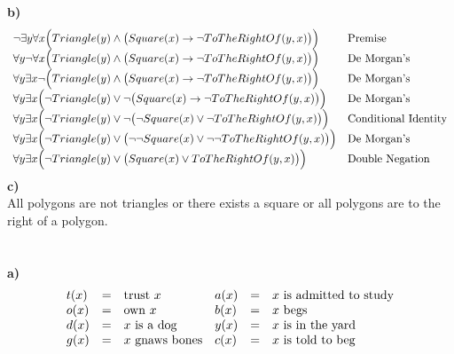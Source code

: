 \documentclass[letterpaper]{article}
\renewcommand\subsection{}
\begin{document}
        \subsection{\bf b)\sf} \\
			\begin{displaymath}
				\begin{array}{ll}
					\neg \exists y \forall x \Big (Triangle(y) \wedge \big (Square(x) \rightarrow \neg ToTheRightOf(y, x)\big)\Big ) 
                    	& $Premise$ \\
                    \forall y \neg \forall x \Big (Triangle(y) \wedge \big (Square(x) \rightarrow \neg ToTheRightOf(y, x)\big)\Big ) 
                    	& $De Morgan's$ \\
                    \forall y \exists x \neg \Big(Triangle(y) \wedge \big (Square(x) \rightarrow \neg ToTheRightOf(y, x)\big)\Big ) 
                    	& $De Morgan's$ \\
                    \forall y \exists x \Big(\neg Triangle(y) \vee \neg \big (Square(x) \rightarrow \neg ToTheRightOf(y, x)\big)\Big ) 
                    	& $De Morgan's$ \\
                    \forall y \exists x \Big(\neg Triangle(y) \vee \neg \big (\neg Square(x) \vee \neg ToTheRightOf(y, x)\big)\Big ) 
                    	& $Conditional Identity$ \\
                    \forall y \exists x \Big(\neg Triangle(y) \vee \big (\neg \neg Square(x) \vee \neg \neg ToTheRightOf(y, x)\big)\Big ) 
                    	& $De Morgan's$ \\
                    \forall y \exists x \Big(\neg Triangle(y) \vee \big (Square(x) \vee ToTheRightOf(y, x)\big)\Big ) 
                    	& $Double Negation$ \\
				\end{array}
			\end{displaymath}
       \subsection{\bf c)\sf} \\
			All polygons are not triangles or there exists a square or all polygons are to the right of a polygon.
	\section{}
    	\subsection{\bf a) \sf}
        	\begin{displaymath}
        		\begin{array}{llllll}
        			t(x) &=& $trust $ x & a(x) &=& x $ is admitted to study$ \\
                    o(x) &=& $own $ x & b(x) &=& x $ begs$ \\
                    d(x) &=& x $ is a dog$ & y(x) &=& x $ is in the yard$ \\
                    g(x) &=& x $ gnaws bones$ & c(x) &=& x $ is told to beg$ \\
        		\end{array}
        	\end{displaymath}
\end{document}
